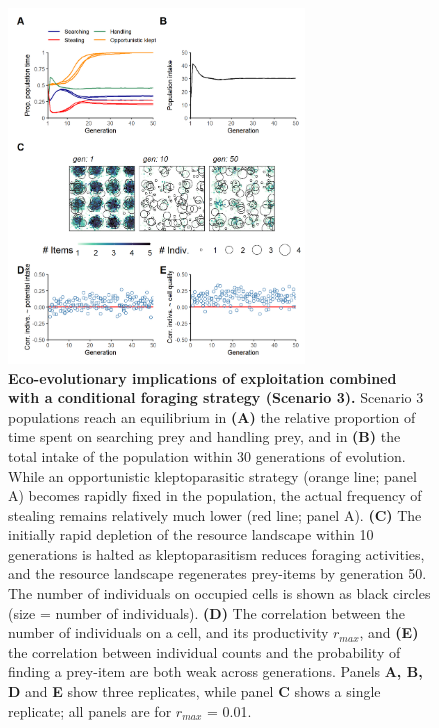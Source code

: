 \documentclass[11pt]{article}
\begin{document}
\begin{figure}[h!]
    \centering
    \includegraphics[width=0.70\textwidth]{figures/fig_04.png}
    \caption{
        \textbf{Eco-evolutionary implications of exploitation combined with a conditional foraging strategy (Scenario 3).}
        Scenario 3 populations reach an equilibrium in \textbf{(A)} the relative proportion of time spent on searching prey and handling prey, and in \textbf{(B)} the total intake of the population within 30 generations of evolution.
        While an opportunistic kleptoparasitic strategy (orange line; panel A) becomes rapidly fixed in the population, the actual frequency of stealing remains relatively much lower (red line; panel A).
        \textbf{(C)} The initially rapid depletion of the resource landscape within 10 generations is halted as kleptoparasitism reduces foraging activities, and the resource landscape regenerates prey-items by generation 50.
        The number of individuals on occupied cells is shown as black circles (size = number of individuals).
        \textbf{(D)} The correlation between the number of individuals on a cell, and its productivity $r_{max}$, and
        \textbf{(E)} the correlation between individual counts and the probability of finding a prey-item are both weak across generations.
        Panels \textbf{A, B, D} and \textbf{E} show three replicates, while panel \textbf{C} shows a single replicate; all panels are for $r_{max}$ = 0.01.
    }
    \label{Fig:Model3}
\end{figure}
\end{document}
